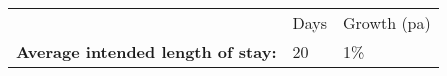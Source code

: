 \begin{tabular}[t]{p{4.8cm}>{\hfill}p{1.3cm}>{\hfill}p{1.4cm}}
   & Days & Growth (pa) \\ 
 \textbf{Average intended length of stay:} & 20 & 1\% \\ 
  \end{tabular}
